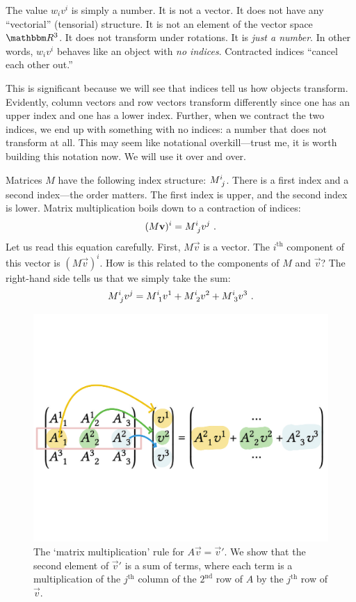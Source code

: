 The value $w_iv^i$ is simply a number. It is not a vector. It does not have any ``vectorial'' (tensorial) structure. It is not an element of the vector space $\RR ^3$. It does not transform under rotations. It is \emph{just a number}. In other words, $w_iv^i$ behaves like an object with \emph{no indices}. Contracted indices ``cancel each other out.''

This is significant because we will see that indices tell us how objects transform. Evidently, column vectors and row vectors transform differently since one has an upper index and one has a lower index. Further, when we contract the two indices, we end up with something with no indices: a number that does not transform at all. This may seem like notational overkill---trust me, it is worth building this notation now. We will use it over and over.



\begin{example}
Matrices $M$ have the following index structure: $M\aij{i}{j}$. There is a first index and a second index---the order matters. The first index is upper, and the second index is lower. Matrix multiplication boils down to a contraction of indices:
\begin{align}
    (M\vec{v})^i = M\aij{i}{j}v^j \ .
    \label{eq:matrix:mult:ith:comp}
\end{align}
Let us read this equation carefully. First, $M\vec{v}$ is a vector. The $i^\text{th}$ component of this vector is $(M\vec{v})^i$. How is this related to the components of $M$ and $\vec{v}$? The right-hand side tells us that we simply take the sum:
\begin{align}
    M\aij{i}{j}v^j = 
    M\aij{i}{1}v^1 + M\aij{i}{2}v^2  + M\aij{i}{3}v^3 \ .
\end{align}
\end{example}

\begin{figure}[tb]
    \centering
    \includegraphics[width=.5\textwidth]{figures/matrixmultiplication.pdf}
    \caption{The `matrix multiplication' rule for $A\vec{v} = \vec{v}'$. We show that the second element of $\vec{v}'$ is a sum of terms, where each term is a multiplication of the $j^\text{th}$ column of the $2^\text{nd}$ row of $A$ by the $j^\text{th}$ row of $\vec{v}$.}
    \label{fig:matrix:col:mult}
\end{figure}

